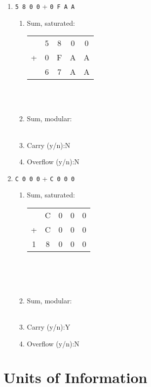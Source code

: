 \documentclass[11pt]{article}
\begin{document}
\begin{enumerate}
\item \texttt{5 8 0 0} \quad + \quad \texttt{0 F A A}
\begin{enumerate}
\item Sum, saturated: \\
\begin{tabular}{c c c c c}
&5&8&0&0\\
+&0&F&A&A\\
\hline
&6&7&A&A
\end{tabular}\\[2pt]
\\[2pt]
\item Sum, modular:\\
\\[2pt]
\item Carry (y/n):N
\item Overflow (y/n):N
\end{enumerate}

\item \texttt{C 0 0 0} \quad + \quad \texttt{C 0 0 0}
\begin{enumerate}
\item Sum, saturated:\\
\begin{tabular}{c c c c c}
&C&0&0&0\\
+&C&0&0&0\\
\hline
1&8&0&0&0
\end{tabular}\\[2pt]
\\
\\[2pt]
\item Sum, modular:\\
\\[2pt]
\item Carry (y/n):Y
\item Overflow (y/n):N
\end{enumerate}

\end{enumerate}

\section{Units of Information}
\end{document}

